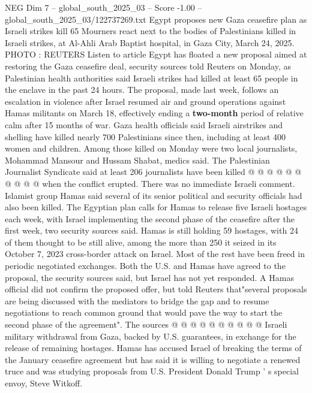 \begin{textsample}{NEG Dim 7 – global\_south\_2025\_03 – Score -1.00 – global\_south\_2025\_03/122737269.txt}  \label{ex:f7_neg_028}
Egypt proposes new Gaza ceasefire plan as Israeli strikes kill 65 Mourners react next to the bodies of Palestinians killed in Israeli strikes, at Al-Ahli Arab Baptist hospital, in Gaza City, March 24, 2025.
PHOTO : REUTERS Listen to article Egypt has floated a new proposal aimed at restoring the Gaza ceasefire deal, security sources told Reuters on Monday, as Palestinian health authorities said Israeli strikes had killed at least 65 people in the enclave in the past 24 hours.
The proposal, made last week, follows an escalation in violence after Israel resumed air and ground operations against Hamas militants on March 18, effectively ending a \textbf{two-month} period of relative calm after 15 months of war.
Gaza health officials said Israeli airstrikes and shelling have killed nearly 700 Palestinians since then, including at least 400 women and children.
Among those killed on Monday were two local journalists, Mohammad Mansour and Hussam Shabat, medics said.
The Palestinian Journalist Syndicate said at least 206 journalists have been killed @ @ @ @ @ @ @ @ @ @ when the conflict erupted.
There was no immediate Israeli comment.
Islamist group Hamas said several of its senior political and security officials had also been killed.
The Egyptian plan calls for Hamas to release five Israeli hostages each week, with Israel implementing the second phase of the ceasefire after the first week, two security sources said.
Hamas is still holding 59 hostages, with 24 of them thought to be still alive, among the more than 250 it seized in its October 7, 2023 cross-border attack on Israel.
Most of the rest have been freed in periodic negotiated exchanges.
Both the U.S. and Hamas have agreed to the proposal, the security sources said, but Israel has not yet responded.
A Hamas official did not confirm the proposed offer, but told Reuters that"several proposals are being discussed with the mediators to bridge the gap and to resume negotiations to reach common ground that would pave the way to start the second phase of the agreement".
The sources @ @ @ @ @ @ @ @ @ @ Israeli military withdrawal from Gaza, backed by U.S. guarantees, in exchange for the release of remaining hostages.
Hamas has accused Israel of breaking the terms of the January ceasefire agreement but has said it is willing to negotiate a renewed truce and was studying proposals from U.S.
President Donald Trump ' s special envoy, Steve Witkoff.

\end{textsample}
